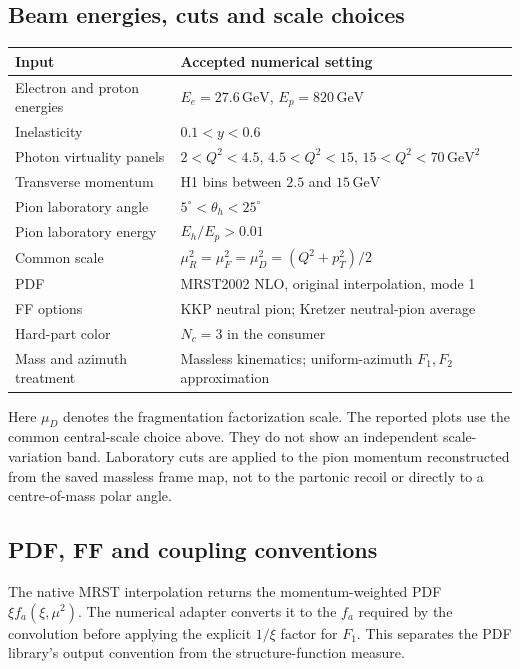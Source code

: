 \documentclass[11pt,a4paper]{article}
\newcommand{\GeV}{\mathrm{GeV}}
\begin{document}
\subsection{Beam energies, cuts and scale choices}

\begin{center}
\begin{tabularx}{\textwidth}{@{}l X@{}}
\toprule
Input & Accepted numerical setting\\
\midrule
Electron and proton energies & $E_e=27.6\,\GeV$, $E_p=820\,\GeV$\\
Inelasticity & $0.1<y<0.6$\\
Photon virtuality panels & $2<Q^2<4.5$, $4.5<Q^2<15$,
 $15<Q^2<70\,\GeV^2$\\
Transverse momentum & H1 bins between $2.5$ and $15\,\GeV$\\
Pion laboratory angle & $5^\circ<\theta_h<25^\circ$\\
Pion laboratory energy & $E_h/E_p>0.01$\\
Common scale & $\mu_R^2=\mu_F^2=\mu_D^2=(Q^2+p_T^2)/2$\\
PDF & MRST2002 NLO, original interpolation, mode 1\\
FF options & KKP neutral pion; Kretzer neutral-pion average\\
Hard-part color & $N_c=3$ in the consumer\\
Mass and azimuth treatment & Massless kinematics; uniform-azimuth
 $F_1,F_2$ approximation\\
\bottomrule
\end{tabularx}
\end{center}

Here $\mu_D$ denotes the fragmentation factorization scale. The
reported plots use the common central-scale choice above. They do not
show an independent scale-variation band. Laboratory cuts are applied
to the pion momentum reconstructed from the saved massless frame map,
not to the partonic recoil or directly to a centre-of-mass polar angle.

\subsection{PDF, FF and coupling conventions}

The native MRST interpolation returns the momentum-weighted PDF
$\xi f_a(\xi,\mu^2)$. The numerical adapter converts it to the
$f_a$ required by the convolution before applying the explicit
$1/\xi$ factor for $F_1$. This separates the PDF library's output
convention from the structure-function measure.
\end{document}
